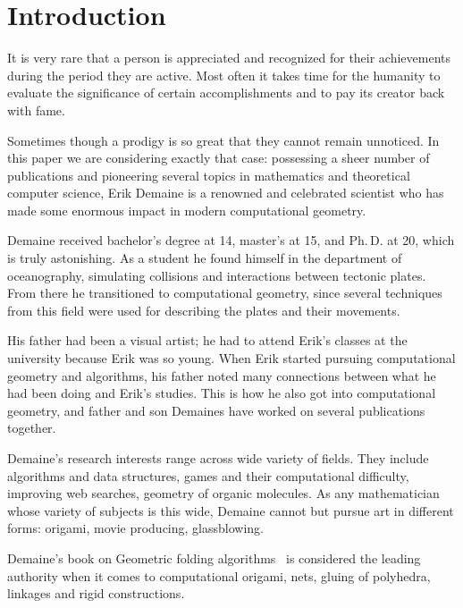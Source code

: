 \documentclass[a4paper,12pt]{article}
\begin{document}
\restoregeometry

\newpage \maketitle \vspace{1cm}

\tableofcontents \vfill \eject

\section{Introduction}

It is very rare that a person is appreciated and recognized for their achievements during the period they are active. Most often it takes time for the humanity to evaluate the significance of certain accomplishments and to pay its creator back with fame.

Sometimes though a prodigy is so great that they cannot remain unnoticed. In this paper we are considering exactly that case: possessing a sheer number of publications and pioneering several topics in mathematics and theoretical computer science, Erik Demaine is a renowned and celebrated scientist who has made some enormous impact in modern computational geometry.

Demaine received bachelor's degree at 14, master's at 15, and Ph.\,D. at 20, which is truly astonishing. As a student he found himself in the department of oceanography, simulating collisions and interactions between tectonic plates. From there he transitioned to computational geometry, since several techniques from this field were used for describing the plates and their movements.

His father had been a visual artist; he had to attend Erik's classes at the university because Erik was so young. When Erik started pursuing computational geometry and algorithms, his father noted many connections between what he had been doing and Erik's studies. This is how he also got into computational geometry, and father and son Demaines have worked on several publications together.

Demaine's research interests range across wide variety of fields. They include algorithms and data structures, games and their computational difficulty, improving web searches, geometry of organic molecules. As any mathematician whose variety of subjects is this wide, Demaine cannot but pursue art in different forms: origami, movie producing, glassblowing.

Demaine's book on Geometric folding algorithms~\cite{DO07} is considered the leading authority when it comes to computational origami, nets, gluing of polyhedra, linkages and rigid constructions.
\end{document}
